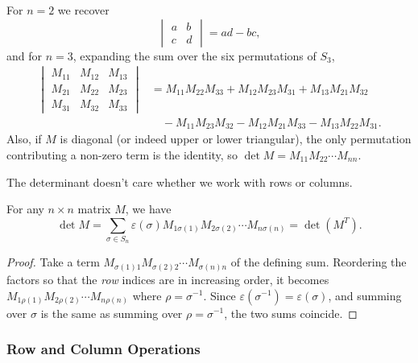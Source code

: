 \documentclass[a4paper]{scrartcl}
\begin{document}
\begin{example}
	For $n = 2$ we recover
	$$
	\begin{vmatrix}
		a & b \\ c & d
	\end{vmatrix} = ad - bc,
	$$
	and for $n = 3$, expanding the sum over the six permutations of $S_3$,
	\begin{align*}
	\begin{vmatrix}
		M_{11} & M_{12} & M_{13} \\
		M_{21} & M_{22} & M_{23} \\
		M_{31} & M_{32} & M_{33}
	\end{vmatrix}
	&= M_{11}M_{22}M_{33} + M_{12}M_{23}M_{31} + M_{13}M_{21}M_{32} \\
	&\quad - M_{11}M_{23}M_{32} - M_{12}M_{21}M_{33} - M_{13}M_{22}M_{31}.
	\end{align*}
	Also, if $M$ is diagonal (or indeed upper or lower triangular), the only permutation contributing a non-zero term is the identity, so $\det M = M_{11}M_{22}\cdots M_{nn}$.
\end{example}

The determinant doesn't care whether we work with rows or columns.

\begin{proposition}[$\det M^T = \det M$]
	For any $n \times n$ matrix $M$, we have
	$$
	\det M = \sum_{\sigma \in S_n} \varepsilon(\sigma)M_{1 \sigma(1)}M_{2\sigma(2)}\cdots M_{n \sigma(n)} = \det (M^T).
	$$
\end{proposition}
\begin{proof}
	Take a term $M_{\sigma(1)1}M_{\sigma(2)2}\cdots M_{\sigma(n)n}$ of the defining sum. Reordering the factors so that the \emph{row} indices are in increasing order, it becomes $M_{1\rho(1)}M_{2\rho(2)}\cdots M_{n\rho(n)}$ where $\rho = \sigma^{-1}$. Since $\varepsilon(\sigma^{-1}) = \varepsilon(\sigma)$, and summing over $\sigma$ is the same as summing over $\rho = \sigma^{-1}$, the two sums coincide.
\end{proof}

\subsubsection{Row and Column Operations}
\end{document}
